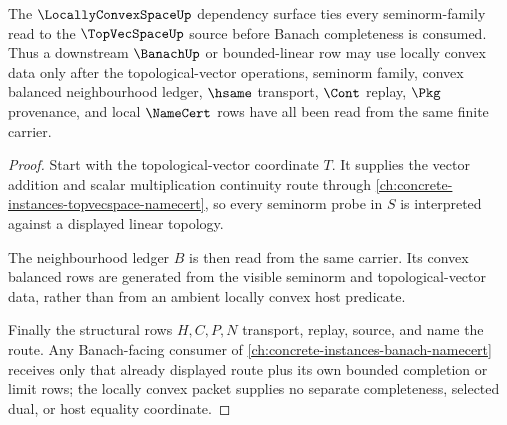 \begin{theorem}
\label{thm:locally-convex-space-topvec-dependency-anchor}
The $\LocallyConvexSpaceUp$ dependency surface ties every seminorm-family read to the $\TopVecSpaceUp$ source before Banach completeness is consumed. Thus a downstream $\BanachUp$ or bounded-linear row may use locally convex data only after the topological-vector operations, seminorm family, convex balanced neighbourhood ledger, $\hsame$ transport, $\Cont$ replay, $\Pkg$ provenance, and local $\NameCert$ rows have all been read from the same finite carrier.
\end{theorem}
\begin{proof}
Start with the topological-vector coordinate $T$. It supplies the vector addition and scalar multiplication continuity route through \autoref{ch:concrete-instances-topvecspace-namecert}, so every seminorm probe in $S$ is interpreted against a displayed linear topology.

The neighbourhood ledger $B$ is then read from the same carrier. Its convex balanced rows are generated from the visible seminorm and topological-vector data, rather than from an ambient locally convex host predicate.

Finally the structural rows $H,C,P,N$ transport, replay, source, and name the route. Any Banach-facing consumer of \autoref{ch:concrete-instances-banach-namecert} receives only that already displayed route plus its own bounded completion or limit rows; the locally convex packet supplies no separate completeness, selected dual, or host equality coordinate.
\end{proof}
